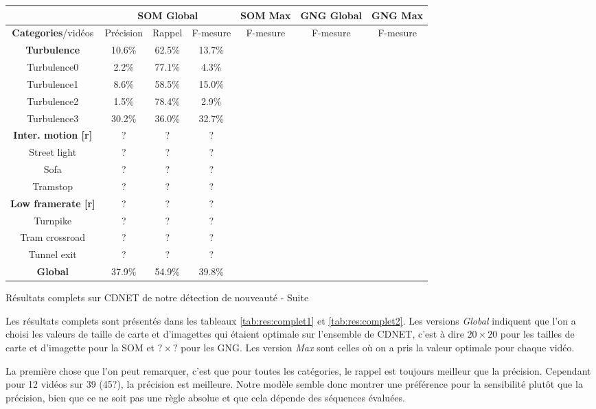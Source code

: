 	\begin{tableth}
    \begin{tabular}{|c|c|c|c|c|c|c|}
		\hline
		& \multicolumn{3}{c|}{SOM Global} & SOM Max & GNG Global & GNG Max\\
        \hline
        \textbf{Categories}/vidéos & Précision & Rappel & F-mesure & F-mesure & F-mesure & F-mesure\\
		\hline
        \textbf{Turbulence} & 10.6\% & 62.5\% & 13.7\% & & &\\
		\hline
		Turbulence0 & 2.2\% & 77.1\% & 4.3\% & & &\\
		Turbulence1 & 8.6\% & 58.5\% & 15.0\% & & &\\
		Turbulence2 & 1.5\% & 78.4\% & 2.9\% & & &\\
		Turbulence3 & 30.2\% & 36.0\% & 32.7\% & & &\\
		\hline
		\textbf{Inter. motion [r]} & ? & ? & ? & & &\\
		\hline
		Street light & ? & ? & ? & & &\\
		Sofa & ? & ? & ? & & &\\
		Tramstop & ? & ? & ? & & &\\
		\hline
        \textbf{Low framerate [r]} & ? & ? & ? & & &\\
		\hline
		Turnpike & ? & ? & ? & & &\\
		Tram crossroad & ? & ? & ? & & &\\
		Tunnel exit & ? & ? & ? & & &\\
        \hline
        \textbf{Global} & 37.9\% & 54.9\% & 39.8\% & & & \\
    	\hline
	\end{tabular}
	\caption{Résultats complets sur CDNET de notre détection de nouveauté - Suite}
	\label{tab:res:complet2}
	\end{tableth}

	Les résultats complets sont présentés dans les tableaux \ref{tab:res:complet1} et \ref{tab:res:complet2}. Les versions \textit{Global} indiquent que l'on a choisi les valeurs de taille de carte et d'imagettes qui étaient optimale sur l'ensemble de CDNET, c'est à dire $20\times20$ pour les tailles de carte et d'imagette pour la SOM et $?\times?$ pour les GNG. Les version \textit{Max} sont celles où on a pris la valeur optimale pour chaque vidéo.

	La première chose que l'on peut remarquer, c'est que pour toutes les catégories, le rappel est toujours meilleur que la précision. Cependant pour 12 vidéos sur 39 (45?), la précision est meilleure. Notre modèle semble donc montrer une préférence pour la sensibilité plutôt que la précision, bien que ce ne soit pas une règle absolue et que cela dépende des séquences évaluées. 

